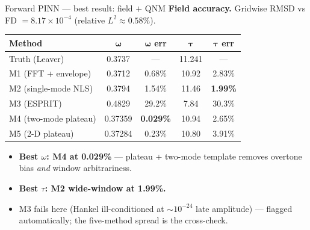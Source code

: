 \documentclass[aspectratio=169, 11pt]{beamer}
\begin{document}
\begin{frame}{Forward PINN --- best result: field $+$ QNM}
  \textbf{Field accuracy.} Gridwise RMSD vs FD $= 8.17\times10^{-4}$
  (relative $L^{2}\approx0.58\%$).
  \medskip
  \begin{center}\footnotesize
    \begin{tabular}{@{}lcccc@{}}
      \toprule
      \textbf{Method} & $\boldsymbol{\omega}$ & $\boldsymbol{\omega}$ \textbf{err} & $\boldsymbol{\tau}$ & $\boldsymbol{\tau}$ \textbf{err} \\
      \midrule
      Truth (Leaver)         & 0.3737  & ---     & 11.241 & ---     \\
      \midrule
      M1 (FFT + envelope)    & 0.3712  & 0.68\%  & 10.92  & 2.83\%  \\
      M2 (single-mode NLS)   & 0.3794  & 1.54\%  & 11.46  & \textbf{1.99\%}  \\
      M3 (ESPRIT)            & 0.4829  & 29.2\%  & 7.84   & 30.3\%  \\
      \rowcolor{green!10}
      M4 (two-mode plateau)  & 0.37359 & \textbf{0.029\%} & 10.94  & 2.65\%  \\
      M5 (2-D plateau)       & 0.37284 & 0.23\%  & 10.80  & 3.91\%  \\
      \bottomrule
    \end{tabular}
  \end{center}
  \medskip
  \begin{itemize}\small
    \item \textbf{Best $\omega$: M4 at 0.029\%} --- plateau + two-mode template
          removes overtone bias \emph{and} window arbitrariness.
    \item \textbf{Best $\tau$: M2 wide-window at 1.99\%.}
    \item M3 fails here (Hankel ill-conditioned at $\sim\!10^{-24}$ late amplitude) ---
          flagged automatically; the five-method spread is the cross-check.
  \end{itemize}
\end{frame}
\end{document}
